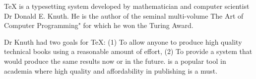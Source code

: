TeX is a typesetting system developed by mathematician and computer
scientist Dr Donald E. Knuth.  He is the author of the seminal multi-volume
The Art of Computer Programming" for which he won the Turing Award.

Dr Knuth had two goals for TeX: (1) To allow anyone to produce high
quality technical books using a reasonable amount of effort, (2) To
provide a system that would produce the same results now or in the
future.  \Latex is a popular tool in academia where high quality and
affordability in publishing is a must.

